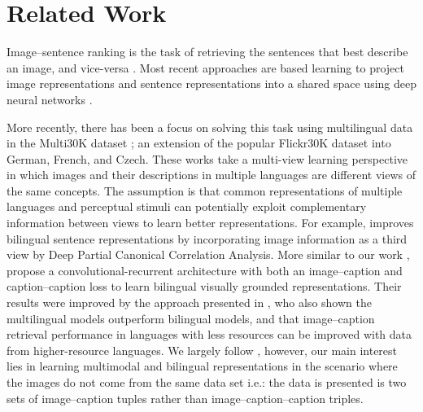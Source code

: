 \section{Related Work}


Image--sentence ranking is the task of retrieving the sentences that best describe an image, and vice-versa \citep{hodosh2013framing}. Most recent approaches are based learning to project image representations and sentence representations into a shared space using deep neural networks \citep[\textit{inter-alia}]{frome2013devise,socher2014grounded,vendrov2016order,faghri2017vse++}. 

More recently, there has been a focus on solving this task using multilingual data \citep{gella2017image,kadar2018conll} in the Multi30K dataset \citep{W16-3210}; an extension of the popular Flickr30K dataset into German, French, and Czech.
These works take a multi-view learning perspective in which 
images and their descriptions in multiple languages are different views of the
same concepts. The assumption is that common representations of multiple languages and perceptual stimuli 
can potentially exploit complementary information
between views to learn better representations. 
For example, \citep{rotman2018bridging} improves bilingual sentence representations by incorporating image information as a third view by Deep Partial Canonical Correlation Analysis.
More similar to our work 
\citep{gella2017image}, propose a convolutional-recurrent architecture with both an image--caption
and caption--caption loss to learn bilingual visually grounded representations. 
Their results were improved by the approach presented in \cite{kadar2018conll}, who also
shown the multilingual models outperform bilingual models, and that image--caption retrieval 
performance in languages with less resources can be improved with data from higher-resource
languages. We largely follow \cite{kadar2018conll}, however, our main interest lies in learning multimodal
and bilingual representations in the scenario where the images do not come from the same
data set i.e.: the data is presented is two sets of image--caption tuples rather than
image--caption--caption triples.

